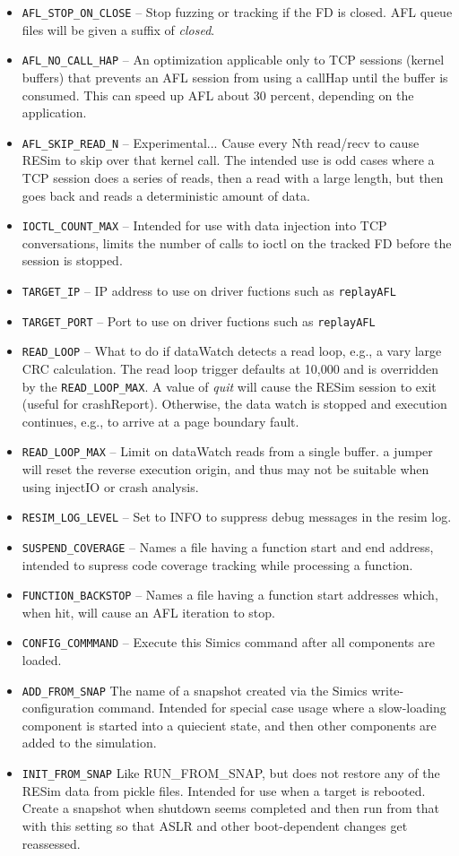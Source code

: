 \documentclass[titlepage]{article}
\begin{document}
\begin{itemize}
\item {\tt AFL\_STOP\_ON\_CLOSE} -- Stop fuzzing or tracking if the FD is closed.  AFL queue files will be given a suffix of \textit{closed}.
\item {\tt AFL\_NO\_CALL\_HAP} -- An optimization applicable only to TCP sessions (kernel buffers) that prevents an AFL session 
from using a callHap until the buffer is consumed.  This can speed up AFL about 30 percent, depending on the application.
\item {\tt AFL\_SKIP\_READ\_N} -- Experimental... Cause every Nth read/recv to cause RESim to skip over that kernel call.  The intended use is odd
cases where a TCP session does a series of reads, then a read with a large length, but then goes back and reads a deterministic amount of data.
\item {\tt IOCTL\_COUNT\_MAX} -- Intended for use with data injection into TCP conversations, limits the number of calls to ioctl on the tracked FD before the
session is stopped.
\item {\tt TARGET\_IP} -- IP address to use on driver fuctions such as {\tt replayAFL}
\item {\tt TARGET\_PORT} -- Port to use on driver fuctions such as {\tt replayAFL}
\item {\tt READ\_LOOP} -- What to do if dataWatch detects a read loop, e.g., a vary large CRC calculation.  The read loop trigger defaults at 10,000
and is overridden by the {\tt READ\_LOOP\_MAX}.  A value of \textit{quit} will cause
the RESim session to exit (useful for crashReport).  Otherwise, the data watch is stopped and execution continues, e.g., to arrive at a page boundary fault.
\item {\tt READ\_LOOP\_MAX} -- Limit on dataWatch reads from a single buffer.
a jumper will reset the reverse execution origin, and thus may not be suitable when using injectIO or crash analysis.
\item {\tt RESIM\_LOG\_LEVEL} -- Set to INFO to suppress debug messages in the resim log.
\item {\tt SUSPEND\_COVERAGE} -- Names a file having a function start and end address, intended to supress code coverage tracking while processing a function.
\item {\tt FUNCTION\_BACKSTOP} -- Names a file having a function start addresses which, when hit, will cause an AFL iteration to stop.
\item {\tt CONFIG\_COMMMAND} -- Execute this Simics command after all components are loaded.
\item {\tt ADD\_FROM\_SNAP} The name of a snapshot created via the Simics write-configuration command.  Intended for special case usage
where a slow-loading component is started into a quiecient state, and then other components are added to the simulation.
\item {\tt INIT\_FROM\_SNAP} Like RUN\_FROM\_SNAP, but does not restore any of the RESim data from pickle files.  Intended for use when a target is rebooted.
Create a snapshot when shutdown seems completed and then run from that with this setting so that ASLR and other boot-dependent changes get reassessed.

\end{itemize}
\end{document}
